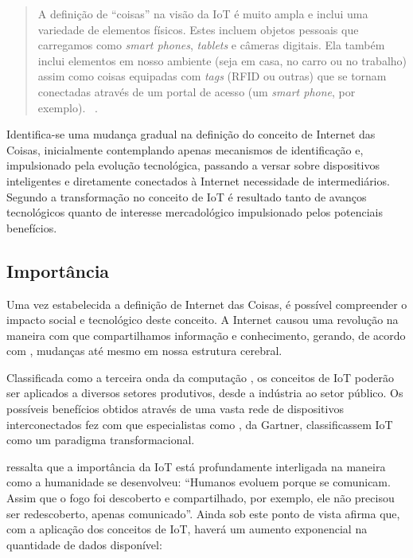 \documentclass[twoside,english,brazilian]{UNISINOSmonografia}
\begin{document}
		\begin{quote}
			A definição de ``coisas'' na visão da IoT é muito ampla e inclui 
			uma variedade de elementos físicos. Estes incluem objetos pessoais 
			que carregamos como \textit{smart phones}, \textit{tablets} e 
			câmeras digitais. Ela também inclui elementos em nosso ambiente 
			(seja em casa, no carro ou no trabalho) assim como coisas 
			equipadas com \textit{tags} (RFID ou outras) que se tornam 
			conectadas através de um portal de acesso (um \textit{smart 
			phone}, por exemplo).~
			\cite{Coetzee2011}.
		\end{quote}
		
		Identifica-se uma mudança gradual na definição do conceito de Internet 
		das Coisas, inicialmente contemplando apenas mecanismos de 
		identificação e, impulsionado pela evolução tecnológica, passando a 
		versar sobre dispositivos inteligentes e diretamente conectados à 
		Internet necessidade de intermediários. Segundo 
		 a transformação no conceito de IoT é resultado 
		tanto de avanços tecnológicos quanto de interesse mercadológico 
		impulsionado pelos potenciais benefícios.
		

\subsection{Importância}

		Uma vez estabelecida a definição de Internet das Coisas, é possível 
		compreender o impacto social e tecnológico deste conceito. A Internet 
		causou uma revolução na maneira com que compartilhamos informação e 
		conhecimento, gerando, de acordo com , mudanças 
		até mesmo em nossa estrutura cerebral.
		
		Classificada como a terceira onda da computação \cite{Register2013}, 
		os conceitos de IoT poderão ser aplicados a diversos setores 
		produtivos, desde a indústria ao setor público. Os possíveis 
		benefícios obtidos através de uma vasta rede de dispositivos 
		interconectados fez com que especialistas como , 
		da Gartner, classificassem IoT como um paradigma transformacional.
		
		 ressalta que a importância da IoT está 
		profundamente interligada na maneira como a humanidade se desenvolveu: 
		``Humanos evoluem porque se comunicam. Assim que o fogo foi descoberto 
		e compartilhado, por exemplo, ele não precisou ser redescoberto, 
		apenas comunicado''. Ainda sob este ponto de vista afirma que, com a 
		aplicação dos conceitos de IoT, haverá um aumento exponencial na 
		quantidade de dados disponível:
		
\end{document}
